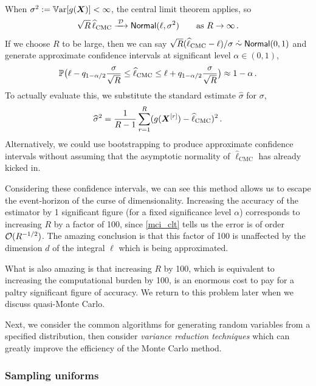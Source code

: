 When $\sigma^2 := \operatorname{\mathbb{V}\mathrm{ar}}[ g(\bm{X}) ] < \infty$, the central limit theorem applies, so
\begin{equation} \label{mci_clt}
\sqrt{R} \, \widehat{\ell}_{\mathrm{CMC}} \xrightarrow{\:\smash{\mathcal{D}}\:} \mathsf{Normal}(\ell, \sigma^2) \qquad \text{as } R \to \infty \,.
\end{equation}
If we choose $R$ to be large, then we can say $\sqrt{R} (\widehat{\ell}_{\mathrm{CMC}} - \ell)/ \sigma \mathrel{\dot\sim} \mathsf{Normal}(0, 1)$ and generate approximate confidence intervals at significant level $\alpha \in (0,1)$,
\begin{equation} \label{CMC_CI}
\operatorname{{\mathbb P}}\bigl( \ell - q_{1-\alpha/2} \frac{\sigma}{\sqrt{R}} \le \widehat{\ell}_{\mathrm{CMC}} \le \ell + q_{1-\alpha/2} \frac{\sigma}{\sqrt{R}} \bigr) \approx 1 - \alpha \,.
\end{equation}
To actually evaluate this, we substitute the standard estimate $\hat{\sigma}$ for $\sigma$,
\begin{equation} \label{basic_mci_var}
\widehat{\sigma}^2 = \frac1{R-1} \sum_{r=1}^R (g(\bm{X}^{[r]}) - \widehat{\ell}_{\mathrm{CMC}})^2 \,.
\end{equation}
Alternatively, we could use bootstrapping to produce approximate confidence intervals without assuming that the asymptotic normality of $\hat{\ell}_{\mathrm{CMC}}$ has already kicked in.

Considering these confidence intervals, we can see this method allows us to escape the event-horizon of the curse of dimensionality. Increasing the accuracy of the estimator by 1 significant figure (for a fixed significance level $\alpha$) corresponds to increasing $R$ by a factor of 100, since \eqref{mci_clt} tells us the error is of order ${\mathcal{O}}(R^{-1/2})$. The amazing conclusion is that this factor of 100 is unaffected by the dimension $d$ of the integral $\ell$ which is being approximated.

What is also amazing is that increasing $R$ by 100, which is equivalent to increasing the computational burden by 100, is an enormous cost to pay for a paltry significant figure of accuracy. We return to this problem later when we discuss quasi-Monte Carlo.

Next, we consider the common algorithms for generating random variables from a specified distribution, then consider \emph{variance reduction techniques} which can greatly improve the efficiency of the Monte Carlo method.

\subsubsection{Sampling uniforms}


